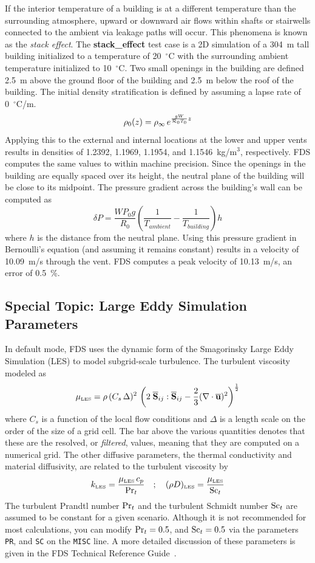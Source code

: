 \documentclass[11pt]{book}
\newcommand{\ct}{\tt\small}
\newcommand{\bu}{{\bf u}}
\newcommand{\bS}{{\bf S}}
\newcommand{\ha}{\frac{1}{2}}
\newcommand{\be}{\begin{equation}}
\newcommand{\ee}{\end{equation}}
\newcommand{\PR}{\hbox{Pr}}
\newcommand{\SC}{\hbox{Sc}}
\begin{document}
If the interior temperature of a building is at a different temperature than the surrounding atmosphere, upward or
downward air flows within shafts
or stairwells connected to the ambient via leakage paths will occur.
This phenomena is known as the {\em stack effect}.  The {\bf stack\_effect} test case
is a 2D simulation of a 304~m tall building initialized to a temperature of 20~$^\circ$C with the surrounding ambient
temperature initialized to
10~$^\circ$C. Two small openings in the building are defined 2.5~m above the ground floor of the building
and 2.5~m below the roof of the building.
The initial density stratification is defined by assuming a lapse rate of 0~$^\circ$C/m.
\be
   \rho_0(z) = \rho_\infty \, e^{ \frac{g W}{{\cal R}_0 T_0} z}
\ee
Applying this to the external and internal locations at the lower and upper vents results in densities of 1.2392, 1.1969, 1.1954, and
1.1546~kg/m$^3$, respectively.  FDS computes the same values to within machine precision.  Since the openings in the building
are equally spaced over
its height, the neutral plane of the building will be close to its midpoint.
The pressure gradient across the building's wall can be computed as
\be
   \delta P = \frac{W P_0 g} {R_{0}} \left( \frac {1}{T_{ambient}} - \frac {1}{T_{building}} \right) h
\ee
where $h$ is the distance from the neutral plane.  Using this pressure gradient in
Bernoulli's equation (and assuming it remains constant) results
in a velocity of 10.09~m/s through the vent.  FDS computes a peak velocity of 10.13~m/s, an error of 0.5~\%.




\subsection{Special Topic: Large Eddy Simulation Parameters}
\label{info:LES}

In default mode, FDS uses the dynamic form of the Smagorinsky Large Eddy Simulation (LES) to model subgrid-scale turbulence. The turbulent viscosity modeled as
\be \mu_{\hbox{\tiny LES}} = \rho \, (C_s\, \Delta)^2 \,
   \left(2 \; \overline{\bS}_{ij} : \overline{\bS}_{ij} - \frac{2}{3} (\nabla \cdot \overline{\bu})^2 \right)^\ha \ee
where $C_s$ is a function of the local flow conditions and $\Delta$ is a length scale on the order of the size of a grid cell. The bar above the various quantities denotes that these are the resolved, or {\em filtered}, values, meaning that they are computed on a numerical grid. The other diffusive parameters, the thermal conductivity and material diffusivity, are related to the turbulent viscosity by
\be k_{\hbox{\tiny LES}} = \frac{\mu_{\hbox{\tiny LES}} \, c_p}{\PR_t}
\quad ; \quad
 (\rho D)_{\hbox{\tiny LES}} =\frac{\mu_{\hbox{\tiny LES}}}{\SC_t} \ee
The turbulent Prandtl number $\PR_t$ and the turbulent Schmidt number $\SC_t$ are assumed to be constant for a given scenario. Although it is not recommended for most calculations, you can modify $\PR_t=0.5$, and $\SC_t=0.5$ via the parameters {\ct PR}, and {\ct SC} on the {\ct MISC} line. A more detailed discussion of these parameters is given in the FDS Technical Reference Guide~\cite{FDS_Math_Guide}.
\end{document}
